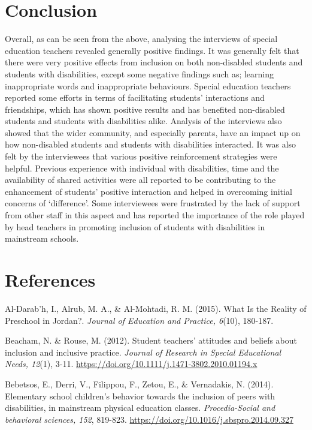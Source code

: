 \documentclass[11.5pt]{sig-alternate}
\begin{document}
\begin{large}
\section*{Conclusion}

Overall, as can be seen from the above, analysing the interviews of special education teachers revealed generally positive findings. It was generally felt that there were very positive effects from inclusion on both non-disabled students and students with disabilities, except some negative findings such as; learning inappropriate words and inappropriate behaviours. Special education teachers reported some efforts in terms of facilitating students’ interactions and friendships, which has shown positive results and has benefited non-disabled students and students with disabilities alike. Analysis of the interviews also showed that the wider community, and especially parents, have an impact up on how non-disabled students and students with disabilities interacted. It was also felt by the interviewees that various positive reinforcement strategies were helpful. Previous experience with individual with disabilities, time and the availability of shared activities were all reported to be contributing to the enhancement of students’ positive interaction and helped in overcoming initial concerns of ‘difference’. Some interviewees were frustrated by the lack of support from other staff in this aspect and has reported the importance of the role played by head teachers in promoting inclusion of students with disabilities in mainstream schools. 

 
\section*{ References}\par 

\leftskip 0.25in
\parindent -0.25in 

Al-Darab'h, I., Alrub, M. A., \& Al-Mohtadi, R. M. (2015). What Is the Reality of Preschool in Jordan?. \textit{Journal of Education and Practice, 6}(10), 180-187.

Beacham, N. \& Rouse, M. (2012). Student teachers' attitudes and beliefs about inclusion and inclusive practice. \textit{Journal of Research in Special Educational Needs, 12}(1), 3-11. \url{https://doi.org/10.1111/j.1471-3802.2010.01194.x}

Bebetsos, E., Derri, V., Filippou, F., Zetou, E., \& Vernadakis, N. (2014). Elementary school children's behavior towards the inclusion of peers with disabilities, in mainstream physical education classes. \textit{Procedia-Social and behavioral sciences, 152}, 819-823. \url{https://doi.org/10.1016/j.sbspro.2014.09.327}


\end{large}
\end{document}
